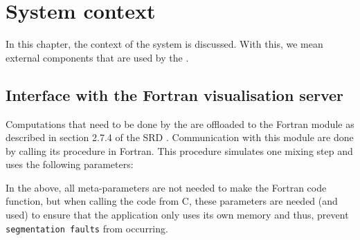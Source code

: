 \chapter{System context}
\label{chap:systcontext}
In this chapter, the context of the system is discussed. With this, we mean external components that are used by the \applicationname{}.

\section{Interface with the Fortran visualisation server}
Computations that need to be done by the \applicationname{} are offloaded to the Fortran module as described in section 2.7.4 of the SRD \cite{srd}. Communication with this module are done by calling its procedure in Fortran. This procedure simulates one mixing step and uses the following parameters:

\begin{center}
\end{center}

\noindent In the above, all meta-parameters are not needed to make the Fortran code function, but when calling the code from C, these parameters are needed (and used) to ensure that the application only uses its own memory and thus, prevent \texttt{segmentation faults} from occurring.